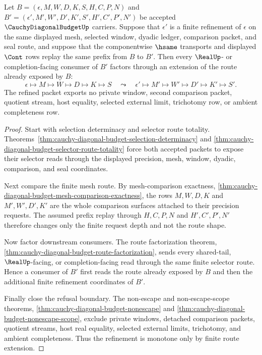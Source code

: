 \begin{theorem}
\label{thm:cauchy-diagonal-budget-prefix-request-monotonicity}
Let $B=(\epsilon,M,W,D,K,S,H,C,P,N)$ and $B'=(\epsilon',M',W',D',K',S',H',C',P',N')$ be accepted $\CauchyDiagonalBudgetUp$ carriers. Suppose that $\epsilon'$ is a finite refinement of $\epsilon$ on the same displayed mesh, selected window, dyadic ledger, comparison packet, and seal route, and suppose that the componentwise $\hsame$ transports and displayed $\Cont$ rows replay the same prefix from $B$ to $B'$. Then every $\RealUp$- or completion-facing consumer of $B'$ factors through an extension of the route already exposed by $B$:
$$
\epsilon \longmapsto M \longmapsto W \longmapsto D \longmapsto K \longmapsto S
\quad\leadsto\quad
\epsilon' \longmapsto M' \longmapsto W' \longmapsto D' \longmapsto K' \longmapsto S'.
$$
The refined packet exports no private window, second comparison packet, quotient stream, host equality, selected external limit, trichotomy row, or ambient completeness row.
\end{theorem}
\begin{proof}
Start with selection determinacy and selector route totality. Theorems~\ref{thm:cauchy-diagonal-budget-selection-determinacy} and \ref{thm:cauchy-diagonal-budget-selector-route-totality} force both accepted packets to expose their selector reads through the displayed precision, mesh, window, dyadic, comparison, and seal coordinates.

Next compare the finite mesh route. By mesh-comparison exactness, \autoref{thm:cauchy-diagonal-budget-mesh-comparison-exactness}, the rows $M,W,D,K$ and $M',W',D',K'$ are the whole comparison surfaces attached to their precision requests. The assumed prefix replay through $H,C,P,N$ and $H',C',P',N'$ therefore changes only the finite request depth and not the route shape.

Now factor downstream consumers. The route factorization theorem, \autoref{thm:cauchy-diagonal-budget-route-factorization}, sends every shared-tail, $\RealUp$-facing, or completion-facing read through the same finite selector route. Hence a consumer of $B'$ first reads the route already exposed by $B$ and then the additional finite refinement coordinates of $B'$.

Finally close the refusal boundary. The non-escape and non-escape-scope theorems, \autoref{thm:cauchy-diagonal-budget-nonescape} and \autoref{thm:cauchy-diagonal-budget-nonescape-scope}, exclude private windows, detached comparison packets, quotient streams, host real equality, selected external limits, trichotomy, and ambient completeness. Thus the refinement is monotone only by finite route extension.
\end{proof}

